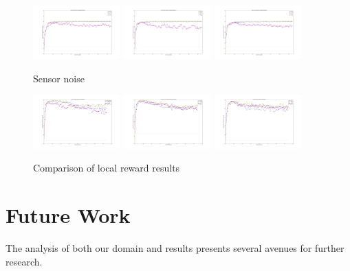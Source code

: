 \documentclass[letterpaper, 10 pt, conference]{ieeeconf}  %
\begin{document}
\begin{figure}
    \centering
    \includegraphics[width=0.3\textwidth]{SN0.png}
    \includegraphics[width=0.3\textwidth]{SN10.png}
    \includegraphics[width=0.3\textwidth]{SN50.png}
    \caption{Sensor noise}
    \label{fig:sensor-noise}
\end{figure}

\begin{figure}
    \centering
    \includegraphics[width=0.3\textwidth]{SR_LocalReward.png}
    \includegraphics[width=0.3\textwidth]{SF_LocalReward.png}
    \includegraphics[width=0.3\textwidth]{SN_LocalReward.png}
    \caption{Comparison of local reward results}
    \label{fig:local-reward-comparison}
\end{figure}

\section{Future Work}
The analysis of both our domain and results presents several avenues for further research.
\end{document}
